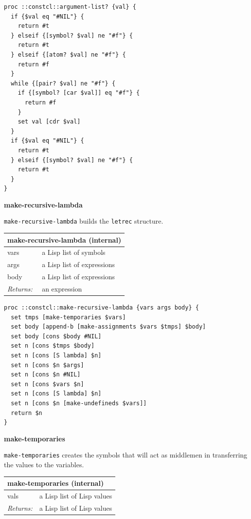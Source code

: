 \documentclass[twoside,9pt]{report}
\begin{document}
\noindent\makebox[\linewidth]{\rule{\linewidth}{0.4pt}}
\begin{lstlisting}
proc ::constcl::argument-list? {val} {
  if {$val eq "#NIL"} {
    return #t
  } elseif {[symbol? $val] ne "#f"} {
    return #t
  } elseif {[atom? $val] ne "#f"} {
    return #f
  }
  while {[pair? $val] ne "#f"} {
    if {[symbol? [car $val]] eq "#f"} {
      return #f
    }
    set val [cdr $val]
  }
  if {$val eq "#NIL"} {
    return #t
  } elseif {[symbol? $val] ne "#f"} {
    return #t
  }
}
\end{lstlisting}
\noindent\makebox[\linewidth]{\rule{\linewidth}{0.4pt}}

\textbf{make-recursive-lambda}


\texttt{make-recursive-lambda} builds the \texttt{letrec} structure.

\begin{tabular}{ |l l| }
\hline
\multicolumn{2}{|l|}{make-recursive-lambda (internal)} \\
\hline
vars & a Lisp list of symbols \\
args & a Lisp list of expressions \\
body & a Lisp list of expressions \\
\textit{Returns:} & an expression \\
\hline
\end{tabular}

\noindent\makebox[\linewidth]{\rule{\linewidth}{0.4pt}}
\begin{lstlisting}
proc ::constcl::make-recursive-lambda {vars args body} {
  set tmps [make-temporaries $vars]
  set body [append-b [make-assignments $vars $tmps] $body]
  set body [cons $body #NIL]
  set n [cons $tmps $body]
  set n [cons [S lambda] $n]
  set n [cons $n $args]
  set n [cons $n #NIL]
  set n [cons $vars $n]
  set n [cons [S lambda] $n]
  set n [cons $n [make-undefineds $vars]]
  return $n
}
\end{lstlisting}
\noindent\makebox[\linewidth]{\rule{\linewidth}{0.4pt}}

\textbf{make-temporaries}


\texttt{make-temporaries} creates the symbols that will act as middlemen in transferring the values to the variables.

\begin{tabular}{ |l l| }
\hline
\multicolumn{2}{|l|}{make-temporaries (internal)} \\
\hline
vals & a Lisp list of Lisp values \\
\textit{Returns:} & a Lisp list of Lisp values \\
\hline
\end{tabular}
\end{document}
